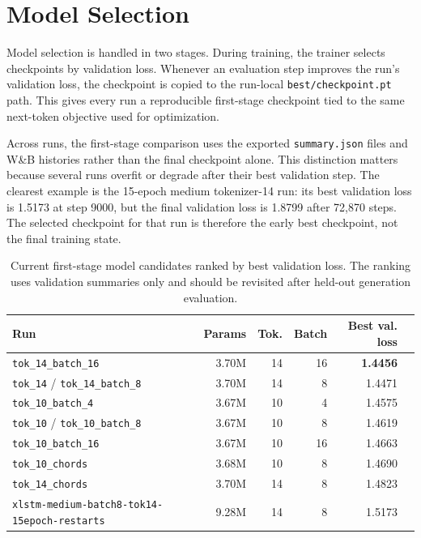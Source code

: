 \section{Model Selection}

Model selection is handled in two stages. During training, the trainer selects checkpoints by validation loss. Whenever an evaluation step improves the run's validation loss, the checkpoint is copied to the run-local \verb|best/checkpoint.pt| path. This gives every run a reproducible first-stage checkpoint tied to the same next-token objective used for optimization.

Across runs, the first-stage comparison uses the exported \verb|summary.json| files and W\&B histories rather than the final checkpoint alone. This distinction matters because several runs overfit or degrade after their best validation step. The clearest example is the 15-epoch medium tokenizer-14 run: its best validation loss is 1.5173 at step 9000, but the final validation loss is 1.8799 after 72,870 steps. The selected checkpoint for that run is therefore the early best checkpoint, not the final training state.

\begin{table}[htbp]
	\centering
	\scriptsize
	\begin{tabular}{lrrrrr}
		\toprule
		Run                                                 & Params & Tok. & Batch & Best val. loss  \\
		\midrule
		\texttt{tok\_14\_batch\_16}                         & 3.70M  & 14   & 16    & \textbf{1.4456} \\
		\texttt{tok\_14} / \texttt{tok\_14\_batch\_8}       & 3.70M  & 14   & 8     & 1.4471          \\
		\texttt{tok\_10\_batch\_4}                          & 3.67M  & 10   & 4     & 1.4575          \\
		\texttt{tok\_10} / \texttt{tok\_10\_batch\_8}       & 3.67M  & 10   & 8     & 1.4619          \\
		\texttt{tok\_10\_batch\_16}                         & 3.67M  & 10   & 16    & 1.4663          \\
		\texttt{tok\_10\_chords}                            & 3.68M  & 10   & 8     & 1.4690          \\
		\texttt{tok\_14\_chords}                            & 3.70M  & 14   & 8     & 1.4823          \\
		\texttt{xlstm-medium-batch8-tok14-15epoch-restarts} & 9.28M  & 14   & 8     & 1.5173          \\
		\bottomrule
	\end{tabular}
	\caption{Current first-stage model candidates ranked by best validation loss. The ranking uses validation summaries only and should be revisited after held-out generation evaluation.}
	\label{tab:model-selection-candidates}
\end{table}

